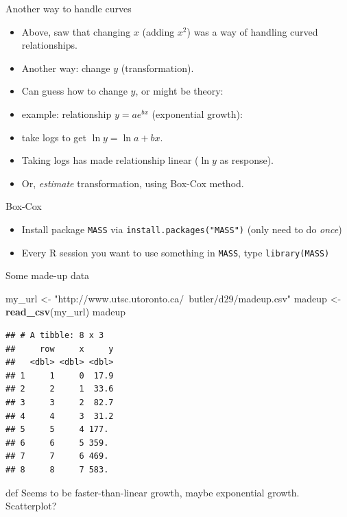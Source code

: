 \documentclass[ignorenonframetext,]{beamer}
\newenvironment{Shaded}{\begin{snugshade}}{\end{snugshade}}
\newcommand{\KeywordTok}[1]{\textcolor[rgb]{0.13,0.29,0.53}{\textbf{#1}}}
\newcommand{\NormalTok}[1]{#1}
\newcommand{\StringTok}[1]{\textcolor[rgb]{0.31,0.60,0.02}{#1}}
\begin{document}
\begin{frame}{Another way to handle curves}
\protect\hypertarget{another-way-to-handle-curves}{}

\begin{itemize}
\item
  Above, saw that changing \(x\) (adding \(x^2\)) was a way of handling
  curved relationships.
\item
  Another way: change \(y\) (transformation).
\item
  Can guess how to change \(y\), or might be theory:
\item
  example: relationship \(y=ae^{bx}\) (exponential growth):
\item
  take logs to get \(\ln y=\ln a + bx\).
\item
  Taking logs has made relationship linear (\(\ln y\) as response).
\item
  Or, \emph{estimate} transformation, using Box-Cox method.
\end{itemize}

\end{frame}

\begin{frame}[fragile]{Box-Cox}
\protect\hypertarget{box-cox}{}

\begin{itemize}
\item
  Install package \texttt{MASS} via \texttt{install.packages("MASS")}
  (only need to do \emph{once})
\item
  Every R session you want to use something in \texttt{MASS}, type
  \texttt{library(MASS)}
\end{itemize}

\end{frame}

\begin{frame}[fragile]{Some made-up data}
\protect\hypertarget{some-made-up-data}{}

\begin{Shaded}
\begin{Highlighting}[]
\NormalTok{my_url <-}\StringTok{ "http://www.utsc.utoronto.ca/~butler/d29/madeup.csv"}
\NormalTok{madeup <-}\StringTok{ }\KeywordTok{read_csv}\NormalTok{(my_url)}
\NormalTok{madeup}
\end{Highlighting}
\end{Shaded}

\begin{verbatim}
## # A tibble: 8 x 3
##     row     x     y
##   <dbl> <dbl> <dbl>
## 1     1     0  17.9
## 2     2     1  33.6
## 3     3     2  82.7
## 4     4     3  31.2
## 5     5     4 177. 
## 6     6     5 359. 
## 7     7     6 469. 
## 8     8     7 583.
\end{verbatim}

def Seems to be faster-than-linear growth, maybe exponential growth.
Scatterplot?

\end{frame}
\end{document}
